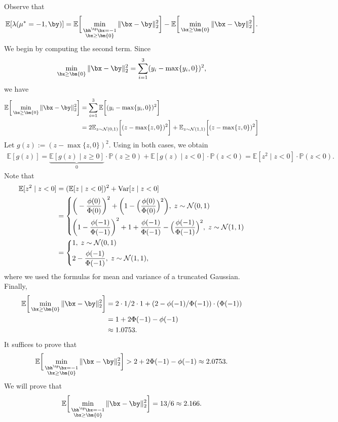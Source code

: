 \documentclass[11pt]{article}
\numberwithin{equation}{section}
\numberwithin{figure}{section}
\begin{document}
Observe that
\begin{equation}
    \mathbb E [\lambda(\mu^* = -1, \by)] = \mathbb E \bigg [\min_{\substack{\bh^\tp \bx = -1 \\ \bx \geq \bm{0}}} \Vert \bx -\by \Vert^2_2\bigg ] - \mathbb{E} \bigg [\min_{\bx \geq \bm{0} } \Vert \bx -\by \Vert^2_2\bigg ].
\end{equation}
We begin by computing the second term. 
Since 
\[
\min_{\bx \geq \bm{0} } \Vert \bx -\by \Vert^2_2 = \sum_{i=1}^3 (y_i - \max\{y_i, 0\})^2,
\]
we have
\begin{align*}
     \mathbb{E} \bigg [\min_{\bx \geq \bm{0} } \Vert \bx -\by \Vert^2_2\bigg ] &=  \sum_{i=1}^3  \mathbb{E} \bigg [ (y_i - \max\{y_i, 0\})^2\bigg ] \\
     &= 2 \mathbb{E}_{z \sim \mathcal N(0,1)} \bigg[ (z-\max\{z,0\})^2 \bigg ] + \mathbb{E}_{z \sim \mathcal N(1,1)} \bigg[ (z-\max\{z,0\})^2 \bigg ]
\end{align*}
Let $g(z) := (z-\max\{z, 0\})^2$. Using in both cases, we obtain 
\begin{align*}
\mathbb E[g(z)] 
= {\underbrace{\mathbb E[g(z)\mid z\geq 0]}_{0}} \cdot {\mathbb P(z \geq 0)} + \mathbb E[g(z)\mid z < 0] \cdot \mathbb P(z < 0) = \mathbb E[z^2 \mid z < 0] \cdot \mathbb P(z < 0).
\end{align*}
Note that
\begin{align*}
\mathbb E[z^2 \mid z < 0] 
&= (\mathbb E[z\mid z < 0])^2 + \mathrm{Var}[z\mid z<0] \\ 
&= \begin{dcases}
      \bigg(-\frac{\phi(0)}{\Phi(0)}\bigg)^2 + \bigg(1 - \Big(\frac{\phi(0)}{\Phi(0)}\Big)^2\bigg),\; z \sim \mathcal N(0,1)\\ 
    \bigg(1- \frac{\phi(-1)}{\Phi(-1)}\bigg)^2 + 1 + \frac{\phi(-1)}{\Phi(-1)} - \Big(\frac{\phi(-1)}{\Phi(-1)}\Big)^2,\; z \sim \mathcal N(1,1)
\end{dcases} \\ 
&= \begin{dcases}
      1, \; z \sim \mathcal N(0,1)\\ 
    2- \frac{\phi(-1)}{\Phi(-1)}, \; z \sim \mathcal N(1,1),
\end{dcases} 
\end{align*}
where we used the formulas for mean and variance of a truncated Gaussian. 
Finally,
\begin{align*}
\mathbb{E} \bigg [\min_{\bx \geq \bm{0} } \Vert \bx -\by \Vert^2_2\bigg ]  
&= 2 \cdot 1/2 \cdot 1 + (2- \phi(-1)/\Phi(-1))\cdot(\Phi(-1)) \\ 
&= 1 + 2\Phi(-1) - \phi(-1) \\ 
&\approx 1.0753.
\end{align*}
It suffices to prove that 
\[
\mathbb E \bigg [\min_{\substack{\bh^\tp \bx = -1 \\ \bx \geq \bm{0}}} \Vert \bx -\by \Vert^2_2 \bigg] > 2 + 2\Phi(-1) - \phi(-1) \approx 2.0753. 
\]
We will prove that 
\[
\mathbb E \bigg [\min_{\substack{\bh^\tp \bx = -1 \\ \bx \geq \bm{0}}}\Vert \bx -\by \Vert^2_2 \bigg]  = 13/6 \approx 2.166.
\]
\end{document}
